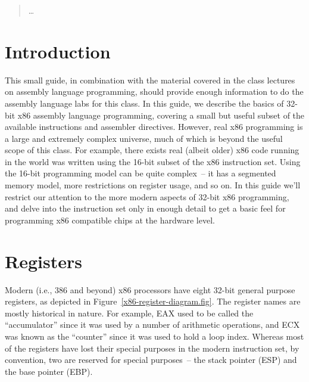 \begin{quotation}
\ldots
\end{quotation}


\section{Introduction}

This small guide, in combination with the material covered in the
class lectures on assembly language programming, should provide enough
information to do the assembly language labs for this class. In this
guide, we describe the basics of 32-bit x86 assembly language
programming, covering a small but useful subset of the available
instructions and assembler directives. However, real x86 programming
is a large and extremely complex universe, much of which is beyond the
useful scope of this class. For example, there exists real (albeit
older) x86 code running in the world was written using the 16-bit
subset of the x86 instruction set. Using the 16-bit programming model
can be quite complex~-- it has a segmented memory model, more
restrictions on register usage, and so on. In this guide we'll
restrict our attention to the more modern aspects of 32-bit x86
programming, and delve into the instruction set only in enough detail
to get a basic feel for programming x86 compatible chips at the
hardware level.

\section{Registers}

Modern (i.e., 386 and beyond) x86 processors have eight 32-bit general
purpose registers, as depicted in
Figure~\ref{x86-register-diagram.fig}. The register names are mostly
historical in nature. For example, EAX used to be called the
``accumulator'' since it was used by a number of arithmetic
operations, and ECX was known as the ``counter'' since it was used to
hold a loop index. Whereas most of the registers have lost their
special purposes in the modern instruction set, by convention, two are
reserved for special purposes~-- the stack pointer (ESP) and the base
pointer (EBP).

